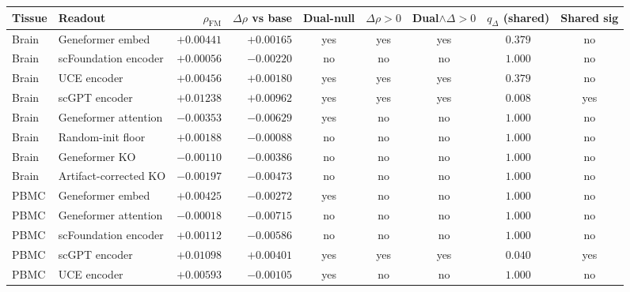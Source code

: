 \begin{tabular}{llrrccccc}
\toprule
Tissue & Readout & $\rho_{\mathrm{FM}}$ & $\Delta\rho$ vs base & Dual-null & $\Delta\rho>0$ & Dual$\wedge\Delta{>}0$ & $q_{\Delta}$ (shared) & Shared sig \\
\midrule
Brain & Geneformer embed & $+0.00441$ & $+0.00165$ & yes & yes & yes & $0.379$ & no \\
Brain & scFoundation encoder & $+0.00056$ & $-0.00220$ & no & no & no & $1.000$ & no \\
Brain & UCE encoder & $+0.00456$ & $+0.00180$ & yes & yes & yes & $0.379$ & no \\
Brain & scGPT encoder & $+0.01238$ & $+0.00962$ & yes & yes & yes & $0.008$ & yes \\
Brain & Geneformer attention & $-0.00353$ & $-0.00629$ & yes & no & no & $1.000$ & no \\
Brain & Random-init floor & $+0.00188$ & $-0.00088$ & no & no & no & $1.000$ & no \\
Brain & Geneformer KO & $-0.00110$ & $-0.00386$ & no & no & no & $1.000$ & no \\
Brain & Artifact-corrected KO & $-0.00197$ & $-0.00473$ & no & no & no & $1.000$ & no \\
PBMC & Geneformer embed & $+0.00425$ & $-0.00272$ & yes & no & no & $1.000$ & no \\
PBMC & Geneformer attention & $-0.00018$ & $-0.00715$ & no & no & no & $1.000$ & no \\
PBMC & scFoundation encoder & $+0.00112$ & $-0.00586$ & no & no & no & $1.000$ & no \\
PBMC & scGPT encoder & $+0.01098$ & $+0.00401$ & yes & yes & yes & $0.040$ & yes \\
PBMC & UCE encoder & $+0.00593$ & $-0.00105$ & yes & no & no & $1.000$ & no \\
\bottomrule
\end{tabular}
